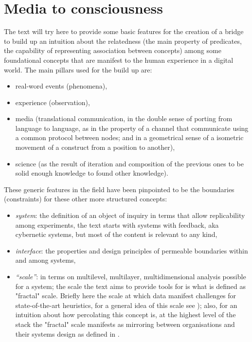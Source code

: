 \documentclass[14pt]{extarticle}
\begin{document}
\section*{Media to consciousness}
\label{sec:media}%

\hspace*{15mm}The text will try here to provide some basic features for the creation of a bridge to build up an intuition about the relatedness (the main property of predicates, the capability of representing association between concepts) among some foundational concepts that are manifest to the human experience in a digital world. The main pillars used for the build up are:
\begin{itemize}
\item real-word events (phenomena),
\item experience (observation),
\item media (translational communication, in the double sense of porting from language to language, as in the property of a channel that communicate using a common protocol between nodes; and in a geometrical sense of a isometric movement of a construct from a position to another),
\item science (as the result of iteration and composition of the previous ones to be solid enough knowledge to found other knowledge).
\end{itemize}
These generic features in the field have been pinpointed to be the boundaries (constraints) for these other more structured concepts:

\begin{itemize}
\item \textit{system}: the definition of an object of inquiry in terms that allow replicability among experiments, the text starts with systems with feedback, aka cybernetic systems, but most of the content is relevant to any kind,
\item \textit{interface}: the properties and design principles of permeable boundaries within and among systems, 
\item \textit{“scale”}: in terms on multilevel, multilayer, multidimensional analysis possible for a system; the scale the text aims to provide tools for is what is defined as "fractal" scale. Briefly here the scale at which data manifest challenges for state-of-the-art heuristics, for a general idea of this scale see \cite{QuantaGraphs}); also, for an intuition about how percolating this concept is, at the highest level of the stack the "fractal" scale manifests as mirroring between organisations and their systems design as defined in \cite{Conway1967HOWDC}.
\end{itemize}
\end{document}
